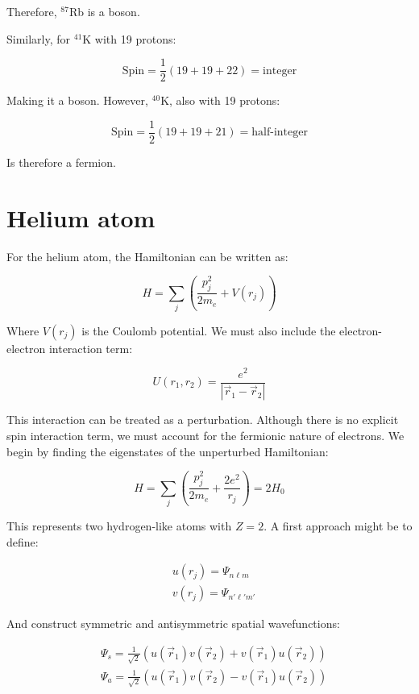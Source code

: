 Therefore, $^{87}$Rb is a boson.

Similarly, for $^{41}$K with 19 protons:

\begin{equation}
\text{Spin}=\frac{1}{2}(19+19+22)=\text{integer}
\end{equation}

Making it a boson. However, $^{40}$K, also with 19 protons:

\begin{equation}
\text{Spin}=\frac{1}{2}(19+19+21)=\text{half-integer}
\end{equation}

Is therefore a fermion.

\section{Helium atom}
For the helium atom, the Hamiltonian can be written as:

\begin{equation}
H=\sum_j(\frac{p_j^2}{2m_e}+V(r_j))
\end{equation}

Where $V(r_j)$ is the Coulomb potential. We must also include the electron-electron interaction term:

\begin{equation}
U(r_1,r_2)=\frac{e^2}{|\vec{r}_1-\vec{r}_2|}
\end{equation}

This interaction can be treated as a perturbation. Although there is no explicit spin interaction term, we must account for the fermionic nature of electrons. We begin by finding the eigenstates of the unperturbed Hamiltonian:

\begin{equation}
H=\sum_j(\frac{p_j^2}{2m_e}+\frac{2e^2}{r_j})=2H_0
\end{equation}

This represents two hydrogen-like atoms with $Z=2$. A first approach might be to define:

\begin{align}
&u(r_j)=\Psi_{n\ell m} \\
&v(r_j)=\Psi_{n'\ell'm'}
\end{align}

And construct symmetric and antisymmetric spatial wavefunctions:

\begin{align}
&\Psi_s=\frac{1}{\sqrt{2}}(u(\vec{r}_1)v(\vec{r}_2)+v(\vec{r}_1)u(\vec{r}_2)) \\
&\Psi_a=\frac{1}{\sqrt{2}}(u(\vec{r}_1)v(\vec{r}_2)-v(\vec{r}_1)u(\vec{r}_2))
\end{align}


